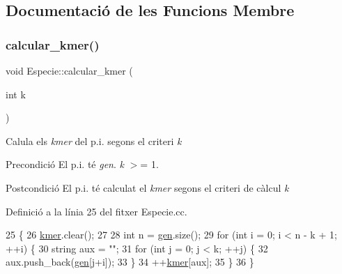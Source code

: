\subsection{Documentació de les Funcions Membre}
\mbox{\label{class_especie_a83fdef791142b0887bfa7f45bd0d5e0e}} 
\subsubsection{\texorpdfstring{calcular\+\_\+kmer()}{calcular\_kmer()}}
{\footnotesize\ttfamily void Especie\+::calcular\+\_\+kmer (\begin{DoxyParamCaption}\item[{int}]{k }\end{DoxyParamCaption})}



Calula els {\itshape kmer} del p.\+i. segons el criteri {\itshape k} 

\begin{DoxyPrecond}{Precondició}
El p.\+i. té {\itshape gen}. {\itshape k} $>$= 1. 
\end{DoxyPrecond}
\begin{DoxyPostcond}{Postcondició}
El p.\+i. té calculat el {\itshape kmer} segons el criteri de càlcul {\itshape k} 
\end{DoxyPostcond}


Definició a la línia 25 del fitxer Especie.\+cc.


\begin{DoxyCode}
25                                  \{
26     \hyperlink{class_especie_ab6740db160f2d7335a98fa8d9f745cbe}{kmer}.clear();
27     
28     \textcolor{keywordtype}{int} n = \hyperlink{class_especie_ac35bb565f7346cd6317b3a8c849456d1}{gen}.size();
29     \textcolor{keywordflow}{for} (\textcolor{keywordtype}{int} i = 0; i < n - k + 1; ++i) \{
30         \textcolor{keywordtype}{string} aux = \textcolor{stringliteral}{""};
31         \textcolor{keywordflow}{for} (\textcolor{keywordtype}{int} j = 0; j < k; ++j) \{
32             aux.push\_back(\hyperlink{class_especie_ac35bb565f7346cd6317b3a8c849456d1}{gen}[j+i]);
33         \}
34         ++\hyperlink{class_especie_ab6740db160f2d7335a98fa8d9f745cbe}{kmer}[aux];
35     \}
36 \}
\end{DoxyCode}
\mbox{\label{class_especie_a1652f05cd2ff7dc71123bf538ecc4476}} 
